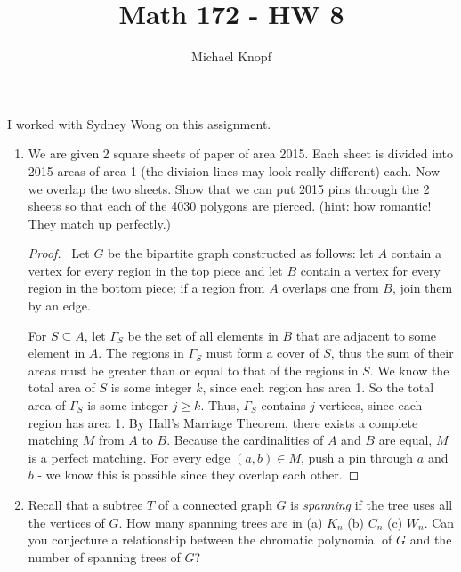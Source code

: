 \documentclass[12pt]{article}
\begin{document}
\title{Math 172 - HW 8}
\author{Michael Knopf}
 
\maketitle

\noindent I worked with Sydney Wong on this assignment.

\begin{enumerate}[leftmargin=0cm,itemindent=.5cm,labelwidth=\itemindent,labelsep=0cm,align=left]

\item We are given 2 square sheets of paper of area 2015.  Each sheet is divided into 2015 areas of area 1 (the division lines may look really different) each.  Now we overlap the two sheets.  Show that we can put 2015 pins through the 2 sheets so that each of the 4030 polygons are pierced. (hint: how romantic!  They match up perfectly.)

\begin{proof}

\ Let $G$ be the bipartite graph constructed as follows: let $A$ contain a vertex for every region in the top piece and let $B$ contain a vertex for every region in the bottom piece; if a region from $A$ overlaps one from $B$, join them by an edge.

For $S \subseteq A$, let $\Gamma_S$ be the set of all elements in $B$ that are adjacent to some element in $A$.  The regions in $\Gamma_S$ must form a cover of $S$, thus the sum of their areas must be greater than or equal to that of the regions in $S$.  We know the total area of $S$ is some integer $k$, since each region has area 1.  So the total area of $\Gamma_S$ is some integer $j \geq k$.  Thus, $\Gamma_S$ contains $j$ vertices, since each region has area 1.  By Hall's Marriage Theorem, there exists a complete matching $M$ from $A$ to $B$.  Because the cardinalities of $A$ and $B$ are equal, $M$ is a perfect matching.  For every edge $(a,b) \in M$, push a pin through $a$ and $b$ - we know this is possible since they overlap each other.

\end{proof}

\item Recall that a subtree $T$ of a connected graph $G$ is \emph{spanning} if the tree uses all the vertices of $G$.  How many spanning trees are in (a) $K_n$ (b) $C_n$ (c) $W_n$.  Can you conjecture a relationship between the chromatic polynomial of $G$ and the number of spanning trees of $G$?


\end{enumerate}
\end{document}
